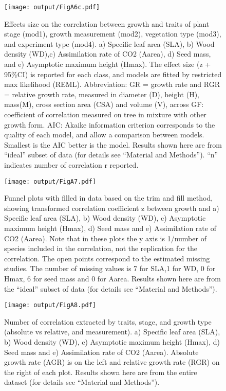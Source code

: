 \documentclass[a4paper,11pt]{article}
\begin{document}
\begin{appendices}
\begin{figure}[h!]
\centering
\texttt{[image: output/FigA6c.pdf]}
\caption{Effects size on the correlation between growth and traits of plant stage (mod1), growth measurement (mod2), vegetation type (mod3), and experiment type (mod4). a) Specific leaf area (SLA), b) Wood density (WD),c) Assimilation rate of CO2 (Aarea), d) Seed mass, and e) Asymptotic maximum height (Hmax). The effect size (z + 95\%CI) is reported for each class, and models are fitted by restricted max likelihood (REML). Abbreviation: GR = growth rate and RGR = relative growth rate, measured in diameter (D), height (H), mass(M), cross section area (CSA) and volume (V), across GF: coefficient of correlation measured on tree in mixture with other growth form. AIC: Akaike information criterion corresponds to the quality of each model, and allow a comparison between models. Smallest is the AIC better is the model. Results shown here are from ``ideal'' subset of data (for details see ``Material and Methods''). ``n'' indicates number of correlation r reported.}
\label{fig:figA6}
\end{figure}

\begin{figure}[h!]
\centering
\texttt{[image: output/FigA7.pdf]}
\caption{Funnel plots with filled in data based on the trim and fill method, showing transformed correlation coefficient z between growth and a) Specific leaf area (SLA), b) Wood density (WD), c) Asymptotic maximum height (Hmax), d) Seed mass and e) Assimilation rate of CO2 (Aarea). Note that in these plots the y axis is 1/number of species included in the correlation, not the replication for the correlation. The open points correspond to the estimated missing studies. The number of missing values is 7 for SLA,1 for WD, 0 for Hmax, 6 for seed mass and 0 for Aarea. Results shown here are from the ``ideal'' subset of data (for details see ``Material and Methods'').}
\label{fig:figA7}
\end{figure}

\begin{figure}[h!]
\centering
\texttt{[image: output/FigA8.pdf]}
\caption{Number of correlation extracted by traits, stage, and growth type (absolute vs relative, and measurement). a) Specific leaf area (SLA), b) Wood density (WD), c) Asymptotic maximum height (Hmax), d) Seed mass and e) Assimilation rate of CO2 (Aarea). Absolute growth rate (AGR) is on the left and relative growth rate (RGR) on the right of each plot. Results shown here are from the entire dataset (for details see ``Material and Methods''). }
\label{fig:figA8}
\end{figure}


\end{appendices}
\end{document}
